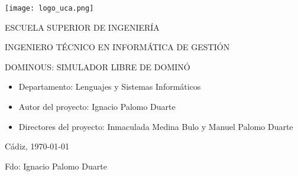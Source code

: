 

\begin{center}

  \texttt{[image: logo\_uca.png]} \\

  \vspace{2.0cm}

  \Large{ESCUELA SUPERIOR DE INGENIERÍA} \\

  \vspace{1.0cm}

  \large{INGENIERO TÉCNICO EN INFORMÁTICA DE GESTIÓN} \\

  \vspace{2.0cm}

  \large{DOMINOUS: SIMULADOR LIBRE DE DOMINÓ} \\

  \vspace{1.0cm}

\end{center}

\begin{itemize}
\item \large{Departamento: Lenguajes y Sistemas Informáticos}
\item \large{Autor del proyecto: Ignacio Palomo Duarte}
\item \large{Directores del proyecto: Inmaculada Medina Bulo y Manuel Palomo Duarte}
\end{itemize}

\vspace{1.0cm}

\begin{flushright}
  \large{Cádiz, \today} \\

  \vspace{2.5cm}

  \large{Fdo: Ignacio Palomo Duarte}
\end{flushright}
